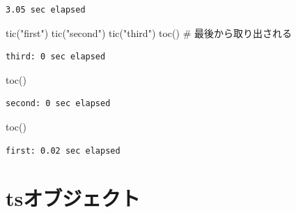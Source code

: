 \documentclass[
  letterpaper,
  DIV=11,
  numbers=noendperiod]{scrreprt}
\newenvironment{Shaded}{\begin{snugshade}}{\end{snugshade}}
\newcommand{\CommentTok}[1]{\textcolor[rgb]{0.37,0.37,0.37}{#1}}
\newcommand{\FunctionTok}[1]{\textcolor[rgb]{0.28,0.35,0.67}{#1}}
\newcommand{\NormalTok}[1]{\textcolor[rgb]{0.00,0.23,0.31}{#1}}
\newcommand{\StringTok}[1]{\textcolor[rgb]{0.13,0.47,0.30}{#1}}
\begin{document}
\begin{verbatim}
3.05 sec elapsed
\end{verbatim}

\begin{Shaded}
\begin{Highlighting}[]
\FunctionTok{tic}\NormalTok{(}\StringTok{"first"}\NormalTok{)}
\FunctionTok{tic}\NormalTok{(}\StringTok{"second"}\NormalTok{)}
\FunctionTok{tic}\NormalTok{(}\StringTok{"third"}\NormalTok{)}
\FunctionTok{toc}\NormalTok{() }\CommentTok{\# 最後から取り出される}
\end{Highlighting}
\end{Shaded}

\begin{verbatim}
third: 0 sec elapsed
\end{verbatim}

\begin{Shaded}
\begin{Highlighting}[]
\FunctionTok{toc}\NormalTok{()}
\end{Highlighting}
\end{Shaded}

\begin{verbatim}
second: 0 sec elapsed
\end{verbatim}

\begin{Shaded}
\begin{Highlighting}[]
\FunctionTok{toc}\NormalTok{()}
\end{Highlighting}
\end{Shaded}

\begin{verbatim}
first: 0.02 sec elapsed
\end{verbatim}

\hypertarget{tsux30aaux30d6ux30b8ux30a7ux30afux30c8}{%
\section{tsオブジェクト}\label{tsux30aaux30d6ux30b8ux30a7ux30afux30c8}}
\end{document}
